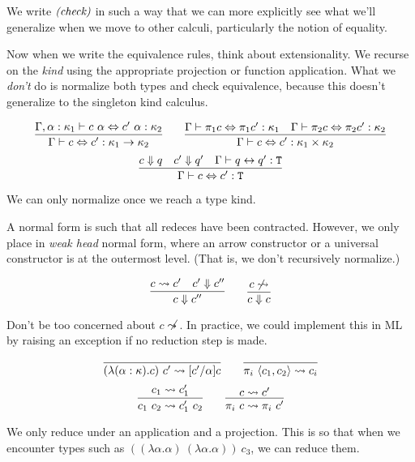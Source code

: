 We write $\emph{(check)}$ in such a way that we can more explicitly see what we'll
generalize when we move to other calculi, particularly the notion of equality.

Now when we write the equivalence rules, think about extensionality. We recurse on the
\emph{kind} using the appropriate projection or function application. What we \emph{don't}
do is normalize both types and check equivalence, because this doesn't generalize to
the singleton kind calculus.

\begin{judgment}
\[ \infer
    {\Gamma \vdash c \Leftrightarrow c' : \kappa_1 \rightarrow \kappa_2}
    {\Gamma, \alpha : \kappa_1 \vdash c~\alpha \Leftrightarrow c'~\alpha : \kappa_2}
  \qquad
  \infer
    {\Gamma \vdash c \Leftrightarrow c' : \kappa_1 \times \kappa_2}
    {\Gamma \vdash \pi_1c \Leftrightarrow \pi_1c' : \kappa_1
    &\Gamma \vdash \pi_2c \Leftrightarrow \pi_2c' : \kappa_2
    }
\]
\[
  \infer
    {\Gamma \vdash c \Leftrightarrow c' : \T}
    {c \Downarrow q
    &c' \Downarrow q'
    &\Gamma \vdash q \leftrightarrow q' : \T
    }
\]
\end{judgment}
We can only normalize once we reach a type kind.

A normal form is such that all redeces have been contracted. However, we
only place in \emph{weak head} normal form, where an arrow constructor or
a universal constructor is at the outermost level. (That is, we don't recursively
normalize.)

\begin{judgment}
\[
  \infer
    {c \Downarrow c''}
    {c \leadsto c' & c' \Downarrow c''}
  \qquad
  \infer
    {c \Downarrow c}
    {c \not\leadsto}
\]
\end{judgment}
Don't be too concerned about $c \not\leadsto$. In practice, we could implement
this in ML by raising an exception if no reduction step is made.

\begin{judgment}
\[
  \infer{(\lambda(\alpha : \kappa).c)~c' \leadsto [c'/\alpha]c}{}
  \qquad
  \infer{\pi_i~\langle c_1, c_2 \rangle \leadsto c_i}{}
\]
\[
  \infer{c_1~c_2 \leadsto c_1'~c_2}{c_1 \leadsto c_1'}
  \qquad
  \infer{\pi_i~c \leadsto \pi_i~c'}{c \leadsto c'}
\]
\end{judgment}
We only reduce under an application and a projection. This is so that when we
encounter types such as $((\lambda \alpha. \alpha)~(\lambda \alpha.\alpha))~c_3$,
we can reduce them.

